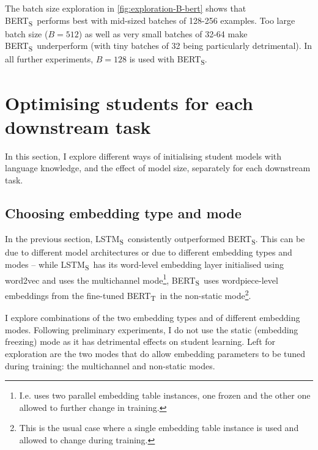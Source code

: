 \documentclass[bsc,frontabs,twoside,singlespacing,parskip,deptreport]{infthesis}
\def\BERTT{BERT\textsubscript{T}}
\def\BERTS{BERT\textsubscript{S}}
\def\LSTMS{LSTM\textsubscript{S}}
\begin{document}
{{{      The batch size exploration in \autoref{fig:exploration-B-bert} shows that \BERTS~performs best with mid-sized batches of 128-256 examples. Too large batch size ($B=512$) as well as very small batches of 32-64 make \BERTS~underperform (with tiny batches of 32 being particularly detrimental).
      In all further experiments, $B=128$ is used with \BERTS.
    }
  }

  \section{Optimising students for each downstream task}{
    In this section, I explore different ways of initialising student models with language knowledge, and the effect of model size, separately for each downstream task.

    \subsection{Choosing embedding type and mode}{
      In the previous section, \LSTMS~consistently outperformed \BERTS. This can be due to different model architectures or due to different embedding types and modes -- while \LSTMS~has its word-level embedding layer initialised using word2vec and uses the multichannel mode\footnote{I.e. uses two parallel embedding table instances, one frozen and the other one allowed to further change in training.}, \BERTS~uses wordpiece-level embeddings from the fine-tuned \BERTT~in the non-static mode\footnote{This is the usual case where a single embedding table instance is used and allowed to change during training.}.

      I explore combinations of the two embedding types and of different embedding modes. Following preliminary experiments, I do not use the static (embedding freezing) mode as it has detrimental effects on student learning. Left for exploration are the two modes that do allow embedding parameters to be tuned during training: the multichannel and non-static modes.

}}}
\end{document}
